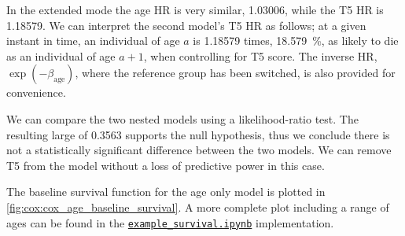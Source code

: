 In the extended mode the age HR is very similar, \num{1.03006},
while the T5 HR is \num{1.18579}.
We can interpret the second model's T5 HR as follows;
at a given instant in time, an individual of age $a$ is
\num{1.18579} times, \ie \SI{18.579}{\percent}, as likely to die as an individual of age $a+1$, when controlling for T5 score.
The inverse HR, $\exp\left(-\beta_{\text{age}}\right)$, where the reference group has been switched, is also provided for convenience.

We can compare the two nested models using a likelihood-ratio test.
The resulting large \pvalue of \num{0.3563} supports the null hypothesis,
thus we conclude there is not a statistically significant difference between the two models.
We can remove T5 from the model without a loss of predictive power in this case.

The baseline survival function for the age only model
is plotted in \cref{fig:cox:cox_age_baseline_survival}.
A more complete plot including a range of ages can be found in the
\href{https://github.com/mepland/data_science_notes/blob/main/sections/appendixes/additional/example_survival.ipynb}{\texttt{example\_survival.ipynb}} implementation.

